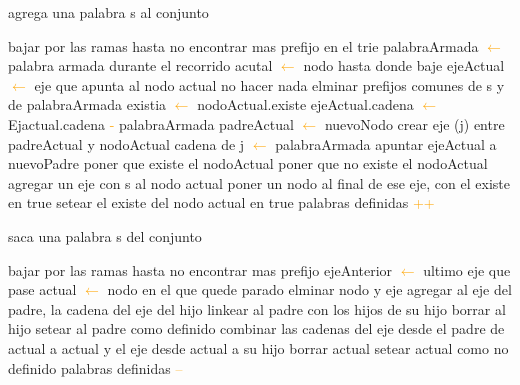 \begin{algorithm}
\caption{agrega una palabra s al conjunto}
\begin{algorithmic}[1]
\STATE bajar por las ramas hasta no encontrar mas prefijo en el trie
\STATE palabraArmada \textcolor{orange}{$\leftarrow$} palabra armada durante el recorrido
\STATE acutal \textcolor{orange}{$\leftarrow$} nodo hasta donde baje
\STATE ejeActual \textcolor{orange}{$\leftarrow$} eje que apunta al nodo actual
	\STATE no hacer nada
\ELSE
	\STATE elminar prefijos comunes de s y de palabraArmada
		\STATE {} 
		\STATE existia \textcolor{orange}{$\leftarrow$} nodoActual.existe
		\STATE ejeActual.cadena \textcolor{orange}{$\leftarrow$} Ejactual.cadena \textcolor{orange}{-} palabraArmada  
		\STATE padreActual \textcolor{orange}{$\leftarrow$} nuevoNodo 
		\STATE crear eje (j) entre padreActual y nodoActual
		\STATE cadena de j \textcolor{orange}{$\leftarrow$} palabraArmada
		\STATE apuntar ejeActual a nuevoPadre 
			\STATE poner que existe el nodoActual
		\ELSE
			\STATE poner que no existe el nodoActual
		\ENDIF
\ENDIF
\ENDIF
		\STATE agregar un eje con s al nodo actual
		\STATE poner un nodo al final de ese eje, con el existe en true
	\ELSE
		\STATE setear el existe del nodo actual en true
	\ENDIF
\STATE palabras definidas \textcolor{orange}{++}
\end{algorithmic}
\end{algorithm}

\begin{algorithm}
\caption{saca una palabra s del conjunto}
\begin{algorithmic}[1]
\STATE bajar por las ramas hasta no encontrar mas prefijo
\STATE ejeAnterior \textcolor{orange}{$\leftarrow$} ultimo eje que pase
\STATE actual \textcolor{orange}{$\leftarrow$} nodo en el que quede parado
		\STATE elminar nodo y eje
		 \STATE {}
		\STATE agregar al eje del padre, la cadena del eje del hijo
		\STATE linkear al padre con los hijos de su hijo
		\STATE borrar al hijo
		\STATE setear al padre como definido
		\ENDIF
	\ELSE
		\STATE {}
		\STATE combinar las cadenas del eje desde el padre de actual a actual y el eje desde actual a su hijo 
		\STATE borrar actual
		\ELSE
				\STATE {}
				\STATE setear actual como no definido
		\ENDIF
	\ENDIF
	\STATE palabras definidas \textcolor{orange}{--}
\ENDIF
\end{algorithmic}
\end{algorithm}		

